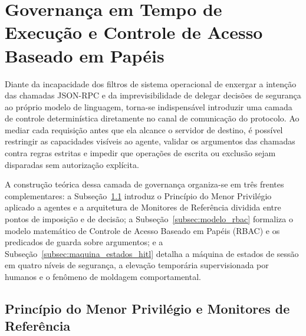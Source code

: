 \section{Governança em Tempo de Execução e Controle de Acesso Baseado em Papéis}
\label{sec:governanca_rbac}

Diante da incapacidade dos filtros de sistema operacional de enxergar a intenção das chamadas JSON-RPC e da imprevisibilidade de delegar decisões de segurança ao próprio modelo de linguagem, torna-se indispensável introduzir uma camada de controle determinística diretamente no canal de comunicação do protocolo. Ao mediar cada requisição antes que ela alcance o servidor de destino, é possível restringir as capacidades visíveis ao agente, validar os argumentos das chamadas contra regras estritas e impedir que operações de escrita ou exclusão sejam disparadas sem autorização explícita.

A construção teórica dessa camada de governança organiza-se em três frentes complementares: a Subseção~\ref{subsec:menor_privilegio_pep} introduz o Princípio do Menor Privilégio aplicado a agentes e a arquitetura de Monitores de Referência dividida entre pontos de imposição e de decisão; a Subseção~\ref{subsec:modelo_rbac} formaliza o modelo matemático de Controle de Acesso Baseado em Papéis (RBAC) e os predicados de guarda sobre argumentos; e a Subseção~\ref{subsec:maquina_estados_hitl} detalha a máquina de estados de sessão em quatro níveis de segurança, a elevação temporária supervisionada por humanos e o fenômeno de moldagem comportamental.

\subsection{Princípio do Menor Privilégio e Monitores de Referência}
\label{subsec:menor_privilegio_pep}


